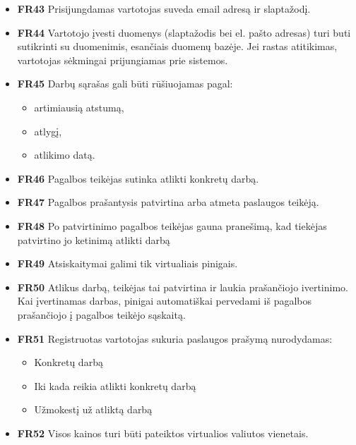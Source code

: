 \documentclass{VUMIFPSbakalaurinis}
\begin{document}
\begin{itemize}
	\item \textbf{FR43} Prisijungdamas vartotojas suveda email adresą ir slaptažodį.
	\item \textbf{FR44} Vartotojo įvesti duomenys (slaptažodis bei el. pašto adresas) turi buti sutikrinti su duomenimis, esančiais duomenų bazėje. Jei rastas atitikimas, vartotojas sėkmingai prijungiamas prie sistemos.
\end{itemize}

\begin{itemize}
	\item \textbf{FR45} Darbų sąrašas gali būti rūšiuojamas pagal:
	\begin{itemize}
		\item artimiausią atstumą,
		\item atlygį,
		\item atlikimo datą.
	\end{itemize}
\end{itemize}

\begin{itemize}
	\item \textbf{FR46} Pagalbos teikėjas sutinka atlikti konkretų darbą.
	\item \textbf{FR47} Pagalbos prašantysis patvirtina arba atmeta paslaugos teikėją.
	\item \textbf{FR48} Po patvirtinimo pagalbos teikėjas gauna pranešimą, kad tiekėjas patvirtino jo ketinimą atlikti darbą
\end{itemize}

\begin{itemize}
	\item \textbf{FR49} Atsiskaitymai galimi tik virtualiais pinigais.
	\item \textbf{FR50} Atlikus darbą, teikėjas tai patvirtina ir laukia prašančiojo ivertinimo. Kai įvertinamas darbas, pinigai automatiškai pervedami iš pagalbos prašančiojo į pagalbos teikėjo sąskaitą.
\end{itemize}

\begin{itemize}
	\item \textbf{FR51} Registruotas vartotojas sukuria paslaugos prašymą nurodydamas:
	\begin{itemize}
		\item Konkretų darbą
		\item Iki kada reikia atlikti konkretų darbą
		\item Užmokestį už atliktą darbą
	\end{itemize}
	\item \textbf{FR52} Visos kainos turi būti pateiktos virtualios valiutos vienetais.
\end{itemize}
\end{document}
